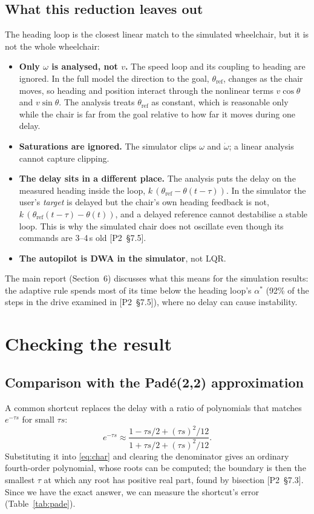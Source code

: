 \documentclass[11pt,a4paper]{article}
\newcommand{\ptwo}[1]{{\small\textsf{[P2~\S#1]}}}
\theoremstyle{definition}
\begin{document}
\subsection{What this reduction leaves out}
The heading loop is the closest linear match to the simulated
wheelchair, but it is not the whole wheelchair:
\begin{itemize}\setlength{\itemsep}{2pt}
\item \textbf{Only $\omega$ is analysed, not $v$.} The speed loop and its
coupling to heading are ignored. In the full model the direction to the
goal, $\theta_{\mathrm{ref}}$, changes as the chair moves, so heading and
position interact through the nonlinear terms $v\cos\theta$ and
$v\sin\theta$. The analysis treats $\theta_{\mathrm{ref}}$ as constant,
which is reasonable only while the chair is far from the goal relative to
how far it moves during one delay.
\item \textbf{Saturations are ignored.} The simulator clips $\omega$ and
$\dot\omega$; a linear analysis cannot capture clipping.
\item \textbf{The delay sits in a different place.} The analysis puts the
delay on the measured heading inside the loop, $k\,(\theta_{\mathrm{ref}} - \theta(t-\tau))$.
In the simulator the user's \emph{target} is delayed but the chair's own
heading feedback is not, $k\,(\theta_{\mathrm{ref}}(t-\tau) - \theta(t))$,
and a delayed reference cannot destabilise a stable loop. This is why the
simulated chair does not oscillate even though its commands are 3--4\,s
old \ptwo{7.5}.
\item \textbf{The autopilot is DWA in the simulator}, not LQR.
\end{itemize}
The main report (Section~6) discusses what this means for the
simulation results: the adaptive rule spends most of its time below the
heading loop's $\alpha^*$ (92\% of the steps in the drive examined in
\ptwo{7.5}), where no delay can cause instability.

\section{Checking the result}
\label{sec:checks}

\subsection{Comparison with the Pad\'e(2,2) approximation}
A common shortcut replaces the delay with a ratio of polynomials that
matches $e^{-\tau s}$ for small $\tau s$:
\[
e^{-\tau s} \approx
\frac{1 - \tau s/2 + (\tau s)^{2}/12}{1 + \tau s/2 + (\tau s)^{2}/12}.
\]
Substituting it into \eqref{eq:char} and clearing the denominator gives
an ordinary fourth-order polynomial, whose roots can be computed; the
boundary is then the smallest $\tau$ at which any root has positive real
part, found by bisection \ptwo{7.3}. Since we have the exact answer, we
can measure the shortcut's error (Table~\ref{tab:pade}).
\end{document}
